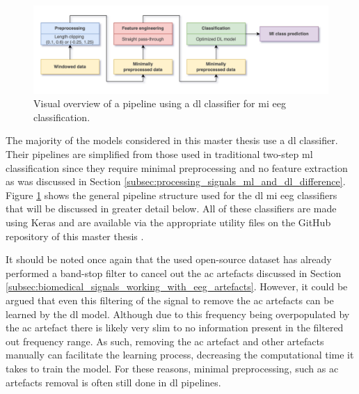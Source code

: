 \begin{figure}[t]
    \centering
    \includegraphics[width=\linewidth]{../images/pipeline/dl_pipeline.pdf}
    \captionsetup{width=0.8\linewidth}
    \captionsetup{justification=centering}
    \caption{Visual overview of a pipeline using a \gls{dl} classifier for \gls{mi} \gls{eeg} classification.}
    \label{fig:offline_bci_system_dl_pipeline}
\end{figure}

The majority of the models considered in this master thesis use a \gls{dl} classifier.
Their pipelines are simplified from those used in traditional two-step \gls{ml} classification since they require minimal preprocessing and no feature extraction as was discussed in Section \ref{subsec:processing_signals_ml_and_dl_difference}.
Figure \ref{fig:offline_bci_system_dl_pipeline} shows the general pipeline structure used for the \gls{dl} \gls{mi} \gls{eeg} classifiers that will be discussed in greater detail below.
All of these classifiers are made using Keras and are available via the appropriate utility files on the GitHub repository of this master thesis \citep{github_project, keras}.

It should be noted once again that the used open-source dataset has already performed a band-stop filter to cancel out the \gls{ac} artefacts discussed in Section \ref{subsec:biomedical_signals_working_with_eeg_artefacts}.
However, it could be argued that even this filtering of the signal to remove the \gls{ac} artefacts can be learned by the \gls{dl} model.
Although due to this frequency being overpopulated by the \gls{ac} artefact there is likely very slim to no information present in the filtered out frequency range.
As such, removing the \gls{ac} artefact and other artefacts manually can facilitate the learning process, decreasing the computational time it takes to train the model.
For these reasons, minimal preprocessing, such as \gls{ac} artefacts removal is often still done in \gls{dl} pipelines.




